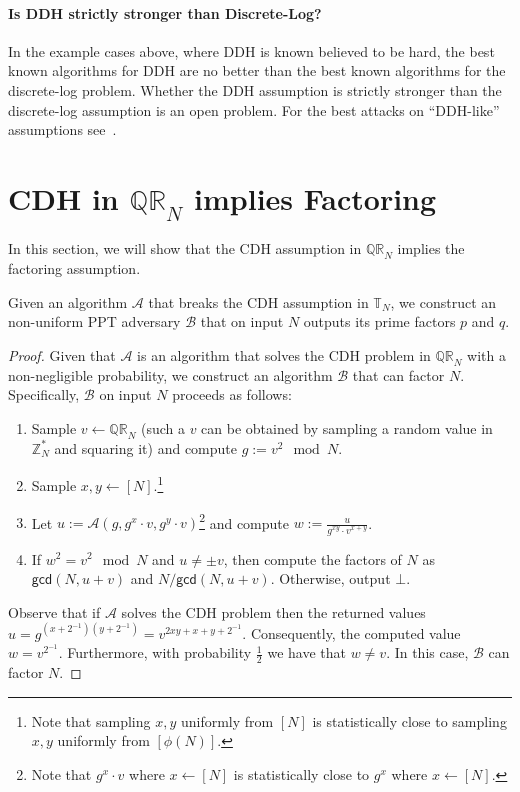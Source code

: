\paragraph{Is DDH strictly stronger than Discrete-Log?} In the example cases above, where DDH is known believed to be hard, the best known algorithms for DDH are no better than the best known algorithms for the discrete-log problem. Whether the DDH assumption is strictly stronger than the discrete-log assumption is an open problem. For the best attacks on ``DDH-like'' assumptions see~\cite{EC:CorKog18}.



\section{CDH in $\mathbb{QR}_N$ implies Factoring}

In this section, we will show that the CDH assumption in $\mathbb{QR}_N$ implies the factoring assumption. 
\begin{lemma}
Given an algorithm $\mathcal{A}$ that breaks the CDH assumption in $\mathbb{T}_N$, we construct an non-uniform PPT adversary $\mathcal{B}$ that on input $N$ outputs its prime factors $p$ and $q$.
\end{lemma}
\begin{proof}
Given that $\mathcal{A}$ is an algorithm that solves the CDH problem in $\mathbb{QR}_N$ with a non-negligible probability, we construct an algorithm $\mathcal{B}$ that can factor $N$. Specifically, $\mathcal{B}$ on input $N$ proceeds as follows:
\begin{enumerate}
\item Sample $v \leftarrow \mathbb{QR}_N$ (such a $v$ can be obtained by sampling a random value in $\mathbb{Z}_N^*$ and squaring it) and compute $g := v^2 \mod N$.
\item Sample $x, y \leftarrow [N]$.\footnote{Note that sampling $x,y$ uniformly from $[N]$ is statistically close to sampling $x,y$ uniformly from $[\phi(N)]$.}
\item Let $ u := \mathcal{A}(g, g^{x}\cdot v, g^y\cdot v)$\footnote{Note that $g^x\cdot v$ where $x \leftarrow [N]$ is statistically close to $g^x$ where $x \leftarrow [N]$.} and compute $w := \frac{u}{g^{xy}\cdot v^{x+y}}$.
\item If $w^2 = v^2 \mod N$ and $u \neq \pm v$, then compute the factors of $N$ as $\mathsf{gcd}(N,u+v)$ and $N/\mathsf{gcd}(N,u+v)$. Otherwise, output $\bot$.
\end{enumerate}
Observe that if $\mathcal{A}$ solves the CDH problem then the returned values $u = g^{(x+ 2^{-1})(y + 2^{-1})} = v^{2xy + x+ y + 2^{-1}}$. Consequently, the computed value $w = v^{2^{-1}}$. Furthermore, with probability $\frac12$ we have that $w \neq v$. In this case, $\mathcal{B}$ can factor $N$.
\end{proof}

